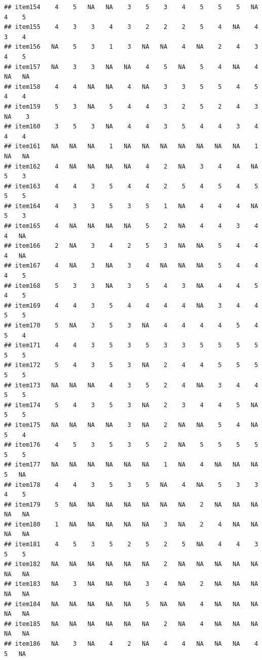 \documentclass[
  man]{apa6}
\begin{document}
\begin{verbatim}
## item154    4    5   NA   NA    3    5    3    4    5    5    5   NA    4    5
## item155    4    3    3    4    3    2    2    2    5    4   NA    4    3    4
## item156   NA    5    3    1    3   NA   NA    4   NA    2    4    3    4    5
## item157   NA    3    3   NA   NA    4    5   NA    5    4   NA    4   NA   NA
## item158    4    4   NA   NA    4   NA    3    3    5    5    4    5    4    4
## item159    5    3   NA    5    4    4    3    2    5    2    4    3   NA    3
## item160    3    5    3   NA    4    4    3    5    4    4    3    4    4    4
## item161   NA   NA   NA    1   NA   NA   NA   NA   NA   NA   NA    1   NA   NA
## item162    4   NA   NA   NA   NA    4    2   NA    3    4    4   NA    5    3
## item163    4    4    3    5    4    4    2    5    4    5    4    5    5    5
## item164    4    3    3    5    3    5    1   NA    4    4    4   NA    5    3
## item165    4   NA   NA   NA   NA    5    2   NA    4    4    3    4    4   NA
## item166    2   NA    3    4    2    5    3   NA   NA    5    4    4    4   NA
## item167    4   NA    3   NA    3    4   NA   NA   NA    5    4    4    4    5
## item168    5    3    3   NA    3    5    4    3   NA    4    4    5    4    5
## item169    4    4    3    5    4    4    4    4   NA    3    4    4    5    5
## item170    5   NA    3    5    3   NA    4    4    4    4    5    4    5    4
## item171    4    4    3    5    3    5    3    3    5    5    5    5    5    5
## item172    5    4    3    5    3   NA    2    4    4    5    5    5    5    5
## item173   NA   NA   NA    4    3    5    2    4   NA    3    4    4    5    5
## item174    5    4    3    5    3   NA    2    3    4    4    5   NA    5    5
## item175   NA   NA   NA   NA    3   NA    2   NA   NA    5    4   NA    5    4
## item176    4    5    3    5    3    5    2   NA    5    5    5    5    5    5
## item177   NA   NA   NA   NA   NA   NA    1   NA    4   NA   NA   NA    5   NA
## item178    4    4    3    5    3    5   NA    4   NA    5    3    3    4    5
## item179    5   NA   NA   NA   NA   NA   NA   NA    2   NA   NA   NA   NA   NA
## item180    1   NA   NA   NA   NA   NA    3   NA    2    4   NA   NA   NA   NA
## item181    4    5    3    5    2    5    2    5   NA    4    4    3    5    5
## item182   NA   NA   NA   NA   NA   NA    2   NA   NA   NA   NA   NA   NA   NA
## item183   NA    3   NA   NA   NA    3    4   NA    2   NA   NA   NA   NA   NA
## item184   NA   NA   NA   NA   NA    5   NA   NA    4   NA   NA   NA   NA   NA
## item185   NA   NA   NA   NA   NA   NA    2   NA    4   NA   NA   NA   NA   NA
## item186   NA    3   NA    4    2   NA    4    4   NA   NA   NA    4    5   NA

\end{verbatim}
\end{document}
